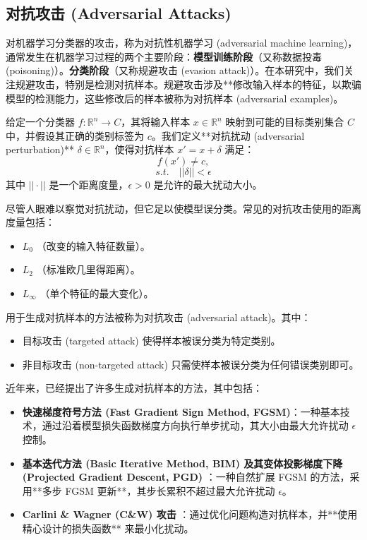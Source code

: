 \documentclass[12pt, a4paper]{ctexart} %
\begin{document}
\subsection{对抗攻击 (Adversarial Attacks)}

对机器学习分类器的攻击，称为对抗性机器学习 (adversarial machine learning)，通常发生在机器学习过程的两个主要阶段：\textbf{模型训练阶段}（又称数据投毒 (poisoning)）。\textbf{分类阶段}（又称规避攻击 (evasion attack)）。在本研究中，我们关注规避攻击，特别是检测对抗样本。规避攻击涉及**修改输入样本的特征，以欺骗模型的检测能力，这些修改后的样本被称为对抗样本 (adversarial examples)。

给定一个分类器 \( f: \mathbb{R}^n \to C \)，其将输入样本 \( x \in \mathbb{R}^n \) 映射到可能的目标类别集合 \( C \) 中，并假设其正确的类别标签为 \( c \)。我们定义**对抗扰动 (adversarial perturbation)** \( \delta \in \mathbb{R}^n \)，使得对抗样本 \( x' = x + \delta \) 满足：
\[
f(x') \neq c,
\]
\[
s.t. \quad ||\delta|| < \epsilon
\]
其中 \( ||\cdot|| \) 是一个距离度量，\( \epsilon > 0 \) 是允许的最大扰动大小。

尽管人眼难以察觉对抗扰动，但它足以使模型误分类。常见的对抗攻击使用的距离度量包括：
\begin{itemize}
    \item \( L_0 \) （改变的输入特征数量）。
    \item \( L_2 \) （标准欧几里得距离）。
    \item \( L_{\infty} \) （单个特征的最大变化）。
\end{itemize}

用于生成对抗样本的方法被称为对抗攻击 (adversarial attack)。其中：
\begin{itemize}
    \item 目标攻击 (targeted attack) 使得样本被误分类为特定类别。
    \item 非目标攻击 (non-targeted attack) 只需使样本被误分类为任何错误类别即可。
\end{itemize}

近年来，已经提出了许多生成对抗样本的方法，其中包括：
\begin{itemize}
    \item \textbf{快速梯度符号方法 (Fast Gradient Sign Method, FGSM)}：一种基本技术，通过沿着模型损失函数梯度方向执行单步扰动，其大小由最大允许扰动 \( \epsilon \) 控制。
    \item \textbf{基本迭代方法 (Basic Iterative Method, BIM) 及其变体投影梯度下降 (Projected Gradient Descent, PGD)} \cite{pgd}：一种自然扩展 FGSM 的方法，采用**多步 FGSM 更新**，其步长累积不超过最大允许扰动 \( \epsilon \)。
    \item \textbf{Carlini \& Wagner (C\&W) 攻击} \cite{cw}：通过优化问题构造对抗样本，并**使用精心设计的损失函数** 来最小化扰动。
\end{itemize}
\end{document}
